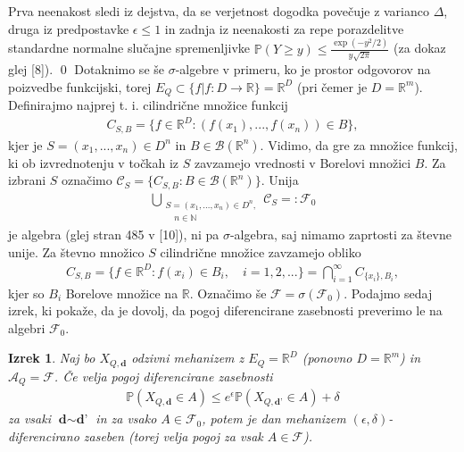 \documentclass[12pt,a4paper]{amsart}
\theoremstyle{definition} %
\theoremstyle{plain} %
\newtheorem{izrek}[definicija]{Izrek}
\begin{document}
Prva neenakost sledi iz dejstva, da se verjetnost dogodka povečuje z varianco $\Delta$, druga iz predpostavke $\epsilon \leq 1$ in zadnja iz neenakosti za repe porazdelitve standardne normalne slučajne spremenljivke $\mathbb{P}(Y \geq y) \leq \frac{\exp(-y^2 / 2)}{y \sqrt{2\pi}}$ (za dokaz glej [8]).
\qed
\newline
\newline
Dotaknimo se še $\sigma$-algebre v primeru, ko je prostor odgovorov na poizvedbe funkcijski, torej $E_Q \subset \{f | f : D \rightarrow \mathbb{R}\} = \mathbb{R}^D$ (pri čemer je $D=\mathbb{R}^m$). Definirajmo najprej t. i. cilindrične množice funkcij 
\begin{gather*}
C_{S,B} = \{ f \in \mathbb{R}^D : (f(x_1), ..., f(x_n)) \in B \},
\end{gather*}
kjer je $S = (x_1,...,x_n) \in D^n$ in $B \in \mathcal{B}(\mathbb{R}^n)$. Vidimo, da gre za množice funkcij, ki ob izvrednotenju v točkah iz $S$ zavzamejo vrednosti v Borelovi množici $B$. Za izbrani $S$ označimo $\mathcal{C}_S = \{ C_{S,B} : B \in \mathcal{B}(\mathbb{R}^n) \}$. Unija 
\begin{gather*}
\bigcup_{\substack{S=(x_1, \ldots, x_n) \in D^n, \\ \quad n \in \mathbb{N}}} \mathcal{C}_S =: \mathcal{F}_0
\end{gather*}
je algebra (glej stran 485 v [10]), ni pa $\sigma$-algebra, saj nimamo zaprtosti za števne unije. Za števno množico $S$ cilindrične množice zavzamejo obliko
\begin{gather*}
C_{S,B} = \{ f \in \mathbb{R}^D : f(x_i) \in B_i,\quad i = 1,2,... \} = \bigcap_{i=1}^{\infty}C_{\{x_i\},B_i},
\end{gather*}
kjer so $B_i$ Borelove množice na $\mathbb{R}$. Označimo še $\mathcal{F} = \sigma(\mathcal{F}_0)$. Podajmo sedaj izrek, ki pokaže, da je dovolj, da pogoj diferencirane zasebnosti preverimo le na algebri $\mathcal{F}_0$. 
\begin{izrek}
Naj bo $X_{Q,\textbf{d}}$ odzivni mehanizem z $E_Q = \mathbb{R}^D$ (ponovno $D = \mathbb{R}^m$) in $\mathcal{A}_Q = \mathcal{F}$. Če velja pogoj diferencirane zasebnosti 
\begin{gather*}
\mathbb{P}(X_{Q,\textbf{d}} \in A) \leq e^\epsilon \mathbb{P}(X_{Q,\textbf{d'}} \in A) + \delta
\end{gather*}
za vsaki $\textbf{d} \sim \textbf{d'}$ in za vsako $A \in \mathcal{F}_0$, potem je dan mehanizem $(\epsilon, \delta)$-diferencirano zaseben (torej velja pogoj za vsak $A \in \mathcal{F}$).
\end{izrek}
\end{document}
